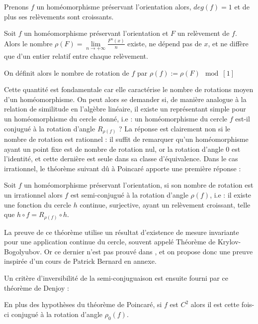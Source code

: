 \documentclass[11pt,a4paper]{article}
\begin{document}
\begin{prop}
Prenons $f$ un homéomorphisme préservant l'orientation alors, $deg(f)=1$ et de plus ses relèvements sont croissants.
\end{prop}

\begin{prop}
Soit $f$ un homéomorphisme préservant l'orientation et $F$ un relèvement de $f$. Alors le nombre $\rho (F)=\displaystyle \lim\limits_{n \to +\infty} \frac{F^n(x)}{n}$ existe, ne dépend pas de $x$, et ne diffère que d'un entier relatif entre chaque relèvement.
\end{prop}

\begin{defin}
On définit alors le nombre de rotation de $f$ par $\rho(f) := \rho (F) \mod[1]$
\end{defin}
Cette quantité est fondamentale car elle caractérise le nombre de rotations moyen d'un homéomorphisme. On peut alors se demander si, de manière analogue à la relation de similitude en l'algèbre linéaire, il existe un représentant simple pour un homéomorphisme du cercle donné, i.e : un homéomorphisme du cercle $f$ est-il conjugué à la rotation d'angle $R_{\rho(f)}$ ? La réponse est clairement non si le nombre de rotation est rationnel : il suffit de remarquer qu'un homéomorphisme ayant un point fixe est de nombre de rotation nul, or la rotation d'angle $0$ est l'identité, et cette dernière est seule dans sa classe d'équivalence. Dans le cas irrationnel, le théorème suivant dû à Poincaré apporte une première réponse :
\begin{thm}[Poincaré]\label{poincare}
Soit $f$ un homéomorphisme préservant l'orientation, si son nombre de rotation est un irrationnel alors $f$ est semi-conjugué à la rotation d'angle $\rho(f)$, i.e : il existe une fonction du cercle $h$ continue, surjective, ayant un relèvement croissant, telle que $h\circ f = R_{\rho(f)} \circ h$.
\end{thm}
\begin{rmq}
La preuve de ce théorème utilise un résultat d'existence de mesure invariante pour une application continue du cercle, souvent appelé Théorème de Krylov-Bogolyubov. Or ce dernier n'est pas prouvé dans \cite{dgv}, et on propose donc une preuve inspirée d'un cours de Patrick Bernard en annexe.
\end{rmq}

Un critère d'inversibilité de la semi-conjuguaison est ensuite fourni par ce théorème de Denjoy :
\begin{thm}[Denjoy]\label{denjoy}
En plus des hypothèses du théorème de Poincaré, si $f$ est $C^2$ alors il est cette fois-ci conjugué à la rotation d'angle $\rho_0(f)$.
\end{thm}
\end{document}
